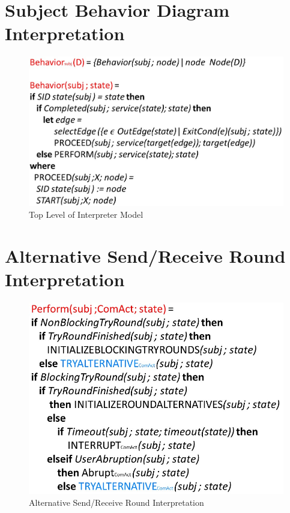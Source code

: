 \section{Subject Behavior Diagram Interpretation}

\footnotesize

\begin{figure}[ph]
	\centering
	\includegraphics[width=0.7\linewidth]{20181026-Ontologie-Bilder/Grafiken-Ontologie/SUbjectExecution/ASM-Behavior}
\caption[Top Level of Interpreter Model]{Top Level of Interpreter Model}
	\label{fig:asm-behavior}
\end{figure}

\newpage
\section{Alternative Send/Receive Round Interpretation}

\begin{figure}[ph]
	\centering
	\includegraphics[width=0.8\linewidth]{20181026-Ontologie-Bilder/Grafiken-Ontologie/SUbjectExecution/ASM-perform}
	\caption[Alternative Send/Receive Round Interpretation]{Alternative Send/Receive Round Interpretation}
	\label{fig:asm-perform}
\end{figure}

